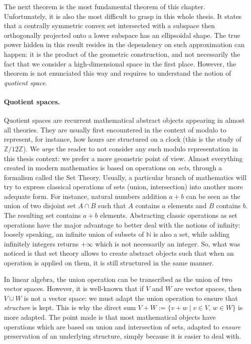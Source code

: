 The next theorem is the most fundamental theorem of this chapter. Unfortunately, it is also the most difficult to grasp in this whole thesis. It states that a centrally symmetric convex set intersected with a subspace then orthogonally projected onto a lower subspace has an ellipsoidal shape. The true power hidden in this result resides in the dependency on such approximation can happen: it is the product of the geometric construction, and not necessarily the fact that we consider a high-dimensional space in the first place. However, the theorem is not enunciated this way and requires to understand the notion of \emph{quotient space}.

\paragraph*{Quotient spaces.} Quotient spaces are recurrent mathematical abstract objects appearing in almost all theories. They are usually first encountered in the context of modulo to represent, for instance, how hours are structured on a clock (this is the study of $\mathbb{Z}/12\mathbb{Z}$). We \emph{urge} the reader to not consider any such modulo representation in this thesis context: we prefer a more geometric point of view. Almost everything created in modern mathematics is based on operations on \emph{sets}, through a formalism called the Set Theory. Usually, a particular branch of mathematics will try to express classical operations of sets (union, intersection) into another more adequate form. For instance, natural numbers addition $a+b$ can be seen as the union of two disjoint set $A\cap B$ such that $A$ contains $a$ elements and $B$ contains $b$. The resulting set contains $a+b$ elements. Abstracting classic operations as set operations have the major advantage to better deal with the notions of infinity: loosely speaking, an infinite union of subsets of $\mathbb{N}$ is also a set, while adding infinitely integers returns $+\infty$ which is not necessarily an integer. So, what was noticed is that set theory allows to create abstract objects such that when an operation is applied on them, it is still structured in the same manner.

In linear algebra, the union operation can be transcribed as the union of two vector spaces. However, it is well-known that if $V$ and $W$ are vector spaces, then $V\cup W$ is not a vector space: we must adapt the union operation to ensure that \emph{structure} is kept. This is why the direct sum $V+W := \{v+w\mid v\in V,\, w\in W\}$ is more adapted. The point made is that most mathematical objects have operations which are based on union and intersection of sets, adapted to \emph{ensure} preservation of an underlying structure, simply because it is easier to deal with. 


